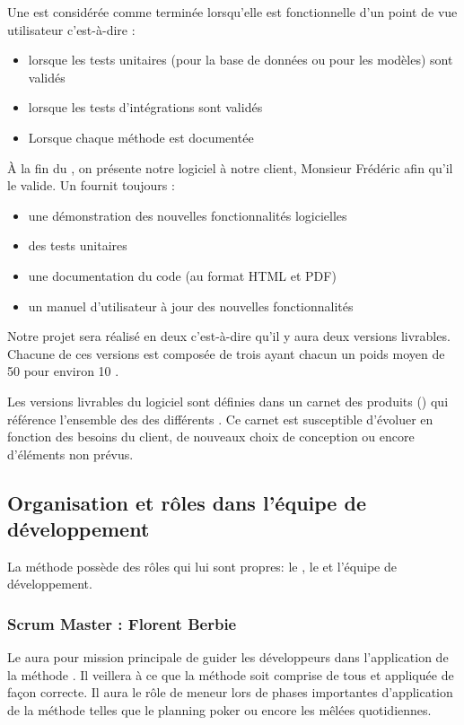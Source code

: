 Une   est considérée comme terminée lorsqu'elle est fonctionnelle d’un point de vue utilisateur c'est-à-dire :
\begin{itemize}
	\item lorsque les tests unitaires (pour la base de données ou pour les modèles) sont validés
	\item lorsque les tests d’intégrations sont validés
	\item Lorsque chaque méthode est documentée
\end{itemize}

À la fin du , on présente notre logiciel à notre client, Monsieur Frédéric  afin qu'il le valide. 
Un  fournit toujours :
\begin{itemize}
	\item une démonstration des nouvelles fonctionnalités logicielles
	\item des tests unitaires
	\item une documentation du code (au format HTML et PDF)
	\item un manuel d’utilisateur à jour des nouvelles fonctionnalités
\end{itemize}

Notre projet sera réalisé en deux  c'est-à-dire qu'il y aura deux versions livrables. Chacune de ces versions est composée de trois 
  ayant chacun un poids moyen de 50 pour environ 10 .

Les versions livrables du logiciel sont définies dans un carnet des produits () qui référence l'ensemble des  des
différents . Ce carnet est susceptible d’évoluer en fonction des besoins du client, de nouveaux choix de conception ou encore d’éléments non prévus. 

\subsection{Organisation et rôles dans l'équipe de développement}
La méthode  possède des rôles qui lui sont propres: le , le  et l'équipe de développement. 

\subsubsection{Scrum Master : Florent Berbie}
Le  aura pour mission principale de guider les développeurs dans l'application de la méthode . Il veillera à ce que la méthode soit
comprise de tous et appliquée de façon correcte. Il aura le rôle de meneur lors de phases importantes d’application de la méthode telles que le
planning poker ou encore les mêlées quotidiennes.
